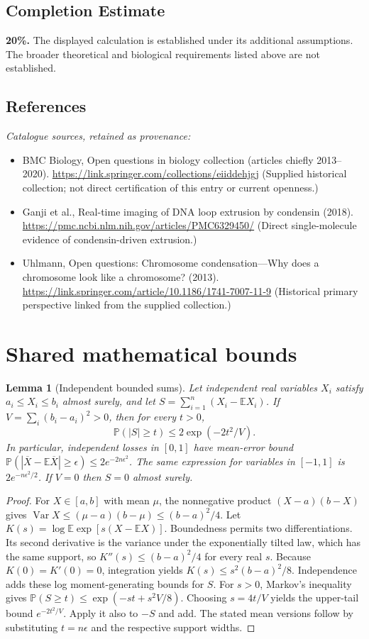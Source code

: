 \documentclass[11pt]{article}
\newcommand{\E}{\mathbb E}
\newcommand{\Prob}{\mathbb P}
\DeclareMathOperator{\Var}{Var}
\providecommand{\E}{\mathbb E}
\providecommand{\Prob}{\mathbb P}
\providecommand{\Var}{\operatorname{Var}}
\newtheorem{sharedlemma}{Lemma}[section]
\begin{document}
\subsection{Completion Estimate}
\textbf{20\%.} The displayed calculation is established under its additional assumptions. The broader theoretical and biological requirements listed above are not established.
\subsection{References}
\noindent\emph{Catalogue sources, retained as provenance:}
\begin{itemize}
\item BMC Biology, Open questions in biology collection (articles chiefly 2013--2020). \url{https://link.springer.com/collections/eiiddehjgj} (Supplied historical collection; not direct certification of this entry or current openness.)
\item Ganji et al., Real-time imaging of DNA loop extrusion by condensin (2018). \url{https://pmc.ncbi.nlm.nih.gov/articles/PMC6329450/} (Direct single-molecule evidence of condensin-driven extrusion.)
\item Uhlmann, Open questions: Chromosome condensation---Why does a chromosome look like a chromosome? (2013). \url{https://link.springer.com/article/10.1186/1741-7007-11-9} (Historical primary perspective linked from the supplied collection.)
\end{itemize}
\clearpage


\appendix
\section{Shared mathematical bounds}\label{app:bounds}
\begin{sharedlemma}[Independent bounded sums]\label{lem:bounded}
Let independent real variables $X_i$ satisfy $a_i\leq X_i\leq b_i$ almost surely,
and let $S=\sum_{i=1}^n(X_i-\E X_i)$. If
$V=\sum_i(b_i-a_i)^2>0$, then for every $t>0$,
\[
 \Prob(|S|\geq t)\leq 2\exp(-2t^2/V).
\]
In particular, independent losses in $[0,1]$ have mean-error bound
$\Prob(|\overline X-\E\overline X|\geq\epsilon)
\leq2e^{-2n\epsilon^2}$. The same expression for variables in $[-1,1]$
is $2e^{-n\epsilon^2/2}$. If $V=0$ then $S=0$ almost surely.
\end{sharedlemma}
\begin{proof}
For $X\in[a,b]$ with mean $\mu$, the nonnegative product
$(X-a)(b-X)$ gives
$\Var X\leq(\mu-a)(b-\mu)\leq(b-a)^2/4$.
Let $K(s)=\log\E\exp[s(X-\E X)]$.
Boundedness permits two differentiations. Its second derivative is the variance
under the exponentially tilted law, which has the same support, so
$K''(s)\leq(b-a)^2/4$ for every real $s$.
Because $K(0)=K'(0)=0$, integration yields
$K(s)\leq s^2(b-a)^2/8$.
Independence adds these log moment-generating bounds for $S$.
For $s>0$, Markov's inequality gives
$\Prob(S\geq t)\leq\exp(-st+s^2V/8)$.
Choosing $s=4t/V$ yields the upper-tail bound $e^{-2t^2/V}$.
Apply it also to $-S$ and add. The stated mean versions follow by substituting
$t=n\epsilon$ and the respective support widths.
\end{proof}
\end{document}
